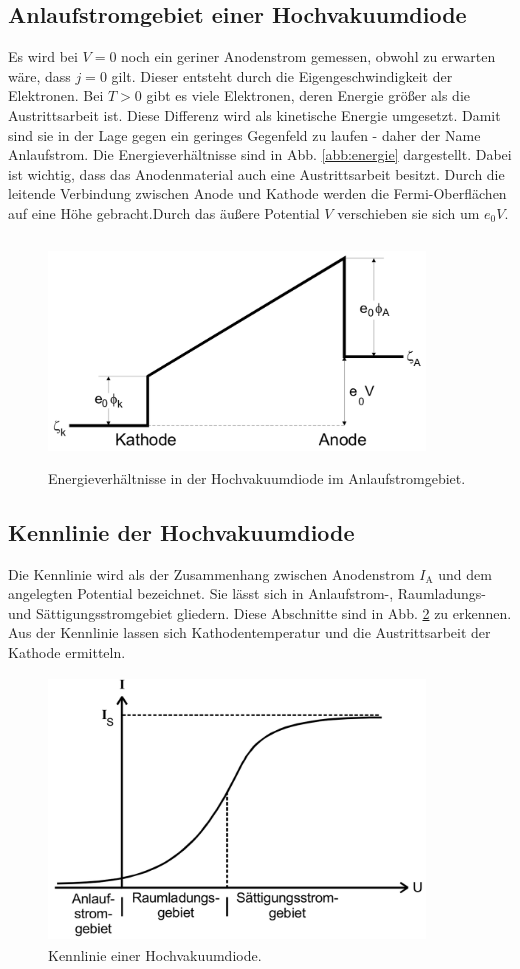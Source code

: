 \subsection{Anlaufstromgebiet einer Hochvakuumdiode}

Es wird bei $V = 0$ noch ein geriner Anodenstrom gemessen, 
obwohl zu erwarten wäre, dass $j = 0$ gilt. Dieser entsteht 
durch die Eigengeschwindigkeit der Elektronen. Bei $T > 0$ 
gibt es viele Elektronen, deren Energie größer als die 
Austrittsarbeit ist. Diese Differenz wird als kinetische 
Energie umgesetzt. Damit sind sie in der Lage gegen ein 
geringes Gegenfeld zu laufen - daher der Name Anlaufstrom. 
Die Energieverhältnisse sind in Abb. \ref{abb:energie}
dargestellt. Dabei ist wichtig, dass das Anodenmaterial auch 
eine Austrittsarbeit besitzt. Durch die leitende Verbindung 
zwischen Anode und Kathode werden die Fermi-Oberflächen auf 
eine Höhe gebracht.Durch das äußere Potential $V$ 
verschieben sie sich um $e_0 V$.

\begin{figure}
    \centering
    \includegraphics[width=10cm, height=6cm]{build/energie.png}
    \caption{Energieverhältnisse in der Hochvakuumdiode im Anlaufstromgebiet. \cite{V504}}
    \label{fig:energie}
\end{figure}

\subsection{Kennlinie der Hochvakuumdiode}

Die Kennlinie wird als der Zusammenhang zwischen Anodenstrom 
$I_\text{A}$ und dem angelegten Potential bezeichnet. 
Sie lässt sich in Anlaufstrom-, Raumladungs- und 
Sättigungsstromgebiet gliedern. 
Diese Abschnitte sind in Abb. \ref{fig:gebiete} zu erkennen.
Aus der Kennlinie lassen sich Kathodentemperatur und die 
Austrittsarbeit der Kathode ermitteln.

\begin{figure}
    \centering
    \includegraphics[width=10cm, height=7cm]{build/gebiete.png}
    \caption{Kennlinie einer Hochvakuumdiode. \cite{V504}}
    \label{fig:gebiete}
\end{figure}